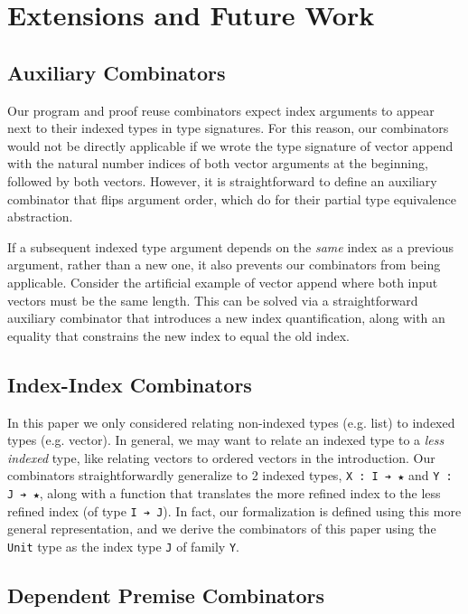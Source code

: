 \documentclass[acmsmall]{acmart}\settopmatter{}
\newcommand{\labsec}[1]{\label{sec:#1}}
\begin{document}
\section{Extensions and Future Work}
\labsec{future}

\subsection{Auxiliary Combinators}

Our program and proof reuse combinators expect index arguments to
appear next to their indexed types in type signatures. For this
reason, our combinators would not be directly applicable if we wrote
the type signature of vector append with the natural number indices of
both vector arguments at the beginning, followed by both
vectors. However, it is straightforward to define an auxiliary combinator that
flips argument order, which \citet{dagand:interop} do for their
partial type equivalence abstraction.

If a subsequent indexed type argument depends on the \textit{same}
index as a previous argument, rather than a new one, it also prevents
our combinators from being applicable. Consider the
artificial example of vector append where both input vectors must be
the same length. This can be solved via a
straightforward auxiliary combinator that introduces a new index quantification,
along with an equality that constrains the new index to equal the old index.

\subsection{Index-Index Combinators}

In this paper we only considered relating non-indexed types (e.g. list)
to indexed types (e.g. vector). In general, we may want to relate
an indexed type to a \textit{less indexed} type, like relating vectors
to ordered vectors in the introduction. Our combinators
straightforwardly generalize to 2 indexed types, \verb;X : I ➔ ★; and
\verb;Y : J ➔ ★;, along with a function that translates
the more refined index to the less refined index
(of type \verb;I ➔ J;). In fact, our formalization is defined using this
more general representation, and we derive the combinators of this
paper using the \verb;Unit; type as the index type \verb;J; of family \verb;Y;.

\subsection{Dependent Premise Combinators}
\end{document}

